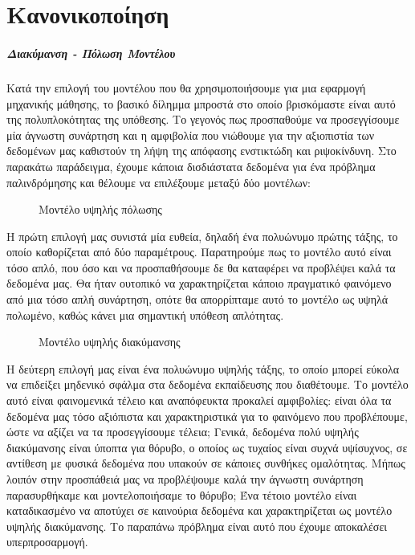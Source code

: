 \chapter{Κανονικοποίηση}
\label{appendix:Reg}
\paragraph{Διακύμανση - Πόλωση Μοντέλου}
Κατά την επιλογή του μοντέλου που θα χρησιμοποιήσουμε για μια εφαρμογή μηχανικής μάθησης, το βασικό δίλημμα μπροστά στο οποίο βρισκόμαστε είναι αυτό της πολυπλοκότητας της υπόθεσης. Το γεγονός πως προσπαθούμε να προσεγγίσουμε μία άγνωστη συνάρτηση και η αμφιβολία που νιώθουμε για την αξιοπιστία των δεδομένων μας καθιστούν τη λήψη της απόφασης ενστικτώδη και ριψοκίνδυνη. Στο παρακάτω παράδειγμα, έχουμε κάποια δισδιάστατα δεδομένα για ένα πρόβλημα παλινδρόμησης και θέλουμε να επιλέξουμε μεταξύ δύο μοντέλων:
\begin{figure}[H]
	\centering			
	\caption[Μοντέλο υψηλής πόλωσης]{Μοντέλο υψηλής πόλωσης}
\end{figure}
Η πρώτη επιλογή μας συνιστά μία ευθεία, δηλαδή ένα πολυώνυμο πρώτης τάξης, το οποίο καθορίζεται από δύο παραμέτρους. Παρατηρούμε πως το μοντέλο αυτό είναι τόσο απλό, που όσο και να προσπαθήσουμε δε θα καταφέρει να προβλέψει καλά τα δεδομένα μας. Θα ήταν ουτοπικό να χαρακτηρίζεται κάποιο πραγματικό φαινόμενο από μια τόσο απλή συνάρτηση, οπότε θα απορρίπταμε αυτό το μοντέλο ως υψηλά πολωμένο, καθώς κάνει μια σημαντική υπόθεση απλότητας.
\begin{figure}[H]
	\centering			
	\caption[Μοντέλο υψηλής διακύμανσης]{Μοντέλο υψηλής διακύμανσης}
\end{figure}
Η δεύτερη επιλογή μας είναι ένα πολυώνυμο υψηλής τάξης, το οποίο μπορεί εύκολα να επιδείξει μηδενικό σφάλμα στα δεδομένα εκπαίδευσης που διαθέτουμε. Το μοντέλο αυτό είναι φαινομενικά τέλειο και αναπόφευκτα προκαλεί αμφιβολίες: είναι όλα τα δεδομένα μας τόσο αξιόπιστα και χαρακτηριστικά για το φαινόμενο που προβλέπουμε, ώστε να αξίζει να τα προσεγγίσουμε τέλεια; Γενικά, δεδομένα πολύ υψηλής διακύμανσης είναι ύποπτα για θόρυβο, ο οποίος ως τυχαίος είναι συχνά υψίσυχνος, σε αντίθεση με φυσικά δεδομένα που υπακούν σε κάποιες συνθήκες ομαλότητας. Μήπως λοιπόν στην προσπάθειά μας να προβλέψουμε καλά την άγνωστη συνάρτηση παρασυρθήκαμε και μοντελοποιήσαμε το θόρυβο; Ένα τέτοιο μοντέλο είναι καταδικασμένο να αποτύχει σε καινούρια δεδομένα και χαρακτηρίζεται ως μοντέλο υψηλής διακύμανσης. Το παραπάνω πρόβλημα είναι αυτό που έχουμε αποκαλέσει υπερπροσαρμογή.

